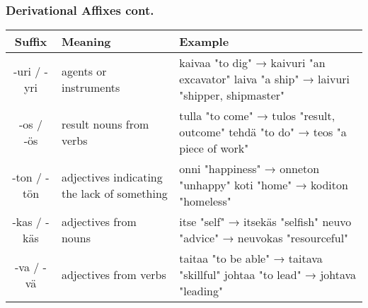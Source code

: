 \documentclass{beamer}
\begin{document}
\begin{frame}
	\frametitle{Derivational Affixes cont.}
    {\scriptsize
    \begin{center}
        \begin{tabular}{|c|p{3cm}|p{5cm}|}
            \hline
            \textbf{Suffix} & \textbf{Meaning} & \textbf{Example}\\\hline
            -uri / -yri &
                agents or instruments &
                kaivaa "to dig" → kaivuri "an excavator" \newline
                laiva "a ship" → laivuri "shipper, shipmaster" \\\hline
            -os / -ös &
                result nouns from verbs &
                tulla "to come" → tulos "result, outcome" \newline
                tehdä "to do" → teos "a piece of work" \\\hline
            -ton / -tön &
                adjectives indicating the lack of something &
                onni "happiness" → onneton "unhappy" \newline
                koti "home" → koditon "homeless" \\\hline
            -kas / -käs &
                adjectives from nouns &
                itse "self" → itsekäs "selfish" \newline
                neuvo "advice" → neuvokas "resourceful" \\\hline
            -va / -vä &
                adjectives from verbs &
                taitaa "to be able" → taitava "skillful" \newline
                johtaa "to lead" → johtava "leading" \\\hline
        \end{tabular}
    \end{center}
    }
\end{frame}
\end{document}
